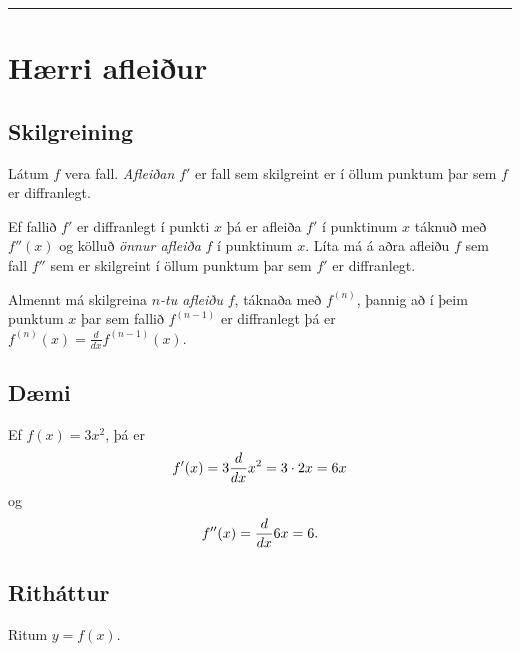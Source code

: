 \documentclass[b5paper,10pt,icelandic]{sphinxmanual}
\begin{document}
\bigskip\hrule{}\bigskip



\section{Hærri afleiður}
\label{kafli03:haerri-afleiur}

\subsection{Skilgreining}
\label{kafli03:skilgreining}
Látum \(f\) vera fall. \emph{Afleiðan} \(f'\) er fall sem skilgreint er
í öllum punktum þar sem \(f\) er diffranlegt.

Ef fallið \(f'\) er diffranlegt í punkti \(x\) þá er afleiða
\(f'\) í punktinum \(x\) táknuð með \(f''(x)\) og kölluð
\textit{önnur afleiða} \(f\) í punktinum \(x\). Líta má á aðra afleiðu
\(f\) sem fall \(f''\) sem er skilgreint í öllum punktum þar sem
\(f'\) er diffranlegt.

Almennt má skilgreina \(n\)\emph{-tu afleiðu} \(f\), táknaða með
\(f^{(n)}\), þannig að í þeim punktum \(x\) þar sem fallið
\(f^{(n-1)}\) er diffranlegt þá er
\(f^{(n)}(x)=\frac{d}{dx}f^{(n-1)}(x)\).


\subsection{Dæmi}
\label{kafli03:id8}
Ef \(f(x)  = 3x^2\), þá er
\begin{gather}
\begin{split}f'(x) = 3\frac{d}{dx}x^2 = 3\cdot 2x = 6x\end{split}\notag
\end{gather}
og
\begin{gather}
\begin{split}f''(x) = \frac{d}{dx} 6x = 6.\end{split}\notag
\end{gather}

\subsection{Ritháttur}
\label{kafli03:id9}
Ritum \(y=f(x)\).
\end{document}
